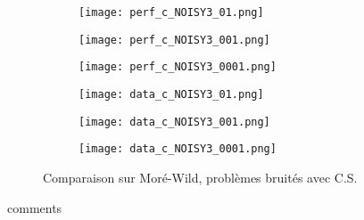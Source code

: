 \documentclass[letterpaper]{scrartcl}
\begin{document}
		\begin{figure}[!htb] %
			\begin{subfigure}{0.48\textwidth}
				\texttt{[image: perf\_c\_NOISY3\_01.png]}
			\end{subfigure}\hspace*{\fill}
			\begin{subfigure}{0.48\textwidth}
				\texttt{[image: perf\_c\_NOISY3\_001.png]}
			\end{subfigure}
			\medskip
			\begin{subfigure}{0.48\textwidth}
				\texttt{[image: perf\_c\_NOISY3\_0001.png]}
			\end{subfigure}\hspace*{\fill}
			\begin{subfigure}{0.48\textwidth}
				\texttt{[image: data\_c\_NOISY3\_01.png]}
			\end{subfigure}
			\medskip
			\begin{subfigure}{0.48\textwidth}
				\texttt{[image: data\_c\_NOISY3\_001.png]}
			\end{subfigure}\hspace*{\fill}
			\begin{subfigure}{0.48\textwidth}
				\texttt{[image: data\_c\_NOISY3\_0001.png]}
			\end{subfigure}
			\caption{Comparaison sur Moré-Wild, problèmes bruités avec C.S.} \label{fig:3}
		\end{figure}
		\clearpage
		comments
		\clearpage
\end{document}
